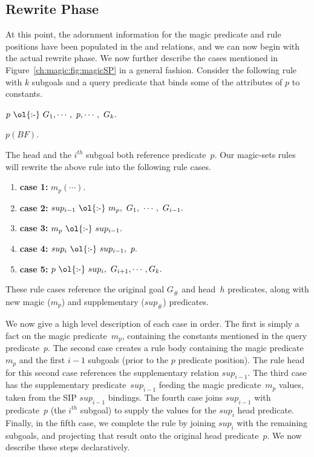 \subsection{Rewrite Phase}
\label{ch:magic:sec:rewrite}
 
At this point, the adornment information for the magic predicate and rule positions
have been populated in the  and  relations, and we can now
begin with the actual rewrite phase.  We now further describe the cases mentioned
in Figure~\ref{ch:magic:fig:magicSP} in a general fashion. Consider the following rule with
$k$ subgoals and a query predicate that binds some of the attributes of $p$ to
constants.
\begin{trivlist}
\ssp
\item $p\ \text{\ol{:-}}\ G_1, \cdots,\ p, \cdots,\ G_k.$
\item $p(BF).$
\end{trivlist}
The head and the $i^{th}$ subgoal both reference predicate~$p$.  Our magic-sets
rules will rewrite the above rule into the following rule cases.
\begin{enumerate}
\ssp
\item {\bf case 1:} $m_p(\cdots).$ 
\item {\bf case 2:} $sup_{i-1}\ \text{\ol{:-}}\ m_p,\ G_1,\ \cdots,\ G_{i-1}.$ 
\item {\bf case 3:} $m_p\ \text{\ol{:-}}\ sup_{i-1}.$ 
\item {\bf case 4:} $sup_i\ \text{\ol{:-}}\ sup_{i-1},\ p.$ 
\item {\bf case 5:} $p\ \text{\ol{:-}}\ sup_i,\ G_{i+1}, \cdots, G_k.$ 
\end{enumerate}
These rule cases reference the original goal $G_{\#}$ and head~$h$ predicates,
along with new magic ($m_p$) and supplementary ($sup_{\#}$) predicates.  


We now give a high level description of each case in order.  The first is
simply a fact on the magic predicate~$m_p$, containing the constants mentioned
in the query predicate~$p$.  The second case creates a rule body containing the
magic predicate~$m_p$ and the first $i-1$ subgoals (prior to the $p$ predicate
position).  The rule head for this second case references the supplementary
relation $sup_{i-1}$.  The third case has the supplementary
predicate~$sup_{i-1}$ feeding the magic predicate~$m_p$ values, taken from the
SIP $sup_{i-1}$ bindings.  The fourth case joins $sup_{i-1}$ with predicate~$p$
(the $i^{th}$ subgoal) to supply the values for the $sup_i$ head predicate.
Finally, in the fifth case, we complete the rule by joining $sup_i$ with the
remaining subgoals, and projecting that result onto the original head
predicate~$p$.  We now describe these steps declaratively.

